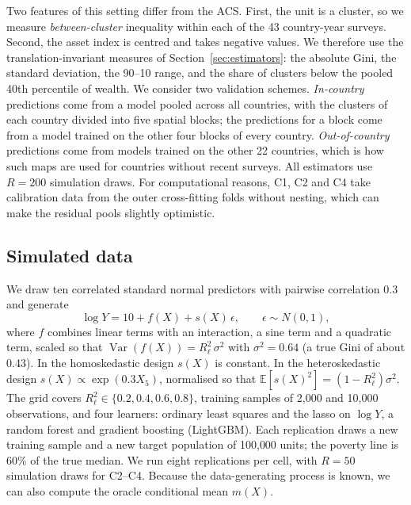 \documentclass[pdflatex,sn-mathphys-ay]{sn-jnl}
\theoremstyle{thmstyleone}%
\theoremstyle{thmstyletwo}%
\theoremstyle{thmstylethree}%
\newcommand{\E}{\mathbb{E}}
\newcommand{\Var}{\operatorname{Var}}
\begin{document}
Two features of this setting differ from the ACS. First, the unit is a cluster, so we measure \emph{between-cluster} inequality within each of the 43 country-year surveys. Second, the asset index is centred and takes negative values. We therefore use the translation-invariant measures of Section~\ref{sec:estimators}: the absolute Gini, the standard deviation, the 90--10 range, and the share of clusters below the pooled 40th percentile of wealth. We consider two validation schemes. \emph{In-country} predictions come from a model pooled across all countries, with the clusters of each country divided into five spatial blocks; the predictions for a block come from a model trained on the other four blocks of every country. \emph{Out-of-country} predictions come from models trained on the other 22 countries, which is how such maps are used for countries without recent surveys. All estimators use $R=200$ simulation draws. For computational reasons, C1, C2 and C4 take calibration data from the outer cross-fitting folds without nesting, which can make the residual pools slightly optimistic.

\subsection{Simulated data}\label{sec:mc_design}

We draw ten correlated standard normal predictors with pairwise correlation 0.3 and generate
\begin{equation*}
\log Y = 10 + f(X) + s(X)\,\epsilon, \qquad \epsilon\sim N(0,1),
\end{equation*}
where $f$ combines linear terms with an interaction, a sine term and a quadratic term, scaled so that $\Var(f(X))=R^2_\ell\,\sigma^2$ with $\sigma^2=0.64$ (a true Gini of about 0.43). In the homoskedastic design $s(X)$ is constant. In the heteroskedastic design $s(X)\propto\exp(0.3X_5)$, normalised so that $\E[s(X)^2]=(1-R^2_\ell)\sigma^2$. The grid covers $R^2_\ell\in\{0.2,0.4,0.6,0.8\}$, training samples of 2{,}000 and 10{,}000 observations, and four learners: ordinary least squares and the lasso on $\log Y$, a random forest and gradient boosting (LightGBM). Each replication draws a new training sample and a new target population of 100{,}000 units; the poverty line is 60\% of the true median. We run eight replications per cell, with $R=50$ simulation draws for C2--C4. Because the data-generating process is known, we can also compute the oracle conditional mean $m(X)$.

\end{document}
